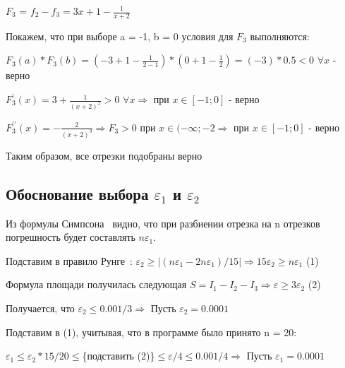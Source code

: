 \documentclass[a4paper,12pt,titlepage,finall]{article}
\begin{document}
\vspace{\baselineskip}

$F_3$ = $f_2 - f_3 = 3x+1-\frac{1}{x+2}$

Покажем, что при выборе a = -1, b = 0 условия для $F_3$ выполняются:

$F_3(a)*F_3(b) = (-3+1-\frac{1}{2-1})*(0+1-\frac{1}{2}) = (-3)*0.5 < 0$ $\forall x$ - верно

$F_3^\prime(x) = 3+\frac{1}{(x+2)^2} > 0$ $\forall x \Rightarrow$ при $x \in [-1; 0]$ - верно

$F_3^{\prime\prime}(x) = -\frac{2}{(x+2)^3} \Rightarrow F_3 > 0$ при $x \in (-\infty; -2 \Rightarrow$ при $x \in [-1; 0]$ - верно

\vspace{\baselineskip}

Таким образом, все отрезки подобраны верно
\newpage

\subsection{Обоснование выбора $\varepsilon_1$ и $\varepsilon_2$}

Из формулы Симпсона~\cite{maths} видно, что при разбиении отрезка на n отрезков погрешность будет составлять $n\varepsilon_1$.

Подставим в правило Рунге~\cite{maths}: $\varepsilon_2 \geq |(n\varepsilon_1 - 2n\varepsilon_1) / 15| \Rightarrow 15\varepsilon_2 \geq n\varepsilon_1$ (1)

Формула площади получилась следующая $S = I_1-I_2-I_3 \Rightarrow \varepsilon \geq 3\varepsilon_2$ (2)

Получается, что $\varepsilon_2 \leq 0.001 / 3 \Rightarrow$ Пусть $\varepsilon_2 = 0.0001$

Подставим в (1), учитывая, что в программе было принято n = 20:\par
$\varepsilon_1 \leq \varepsilon_2*15/20 \leq $\{подставить (2)\}$\leq \varepsilon/4 \leq 0.001/4 \Rightarrow$ Пусть $\varepsilon_1 = 0.0001$
\end{document}
